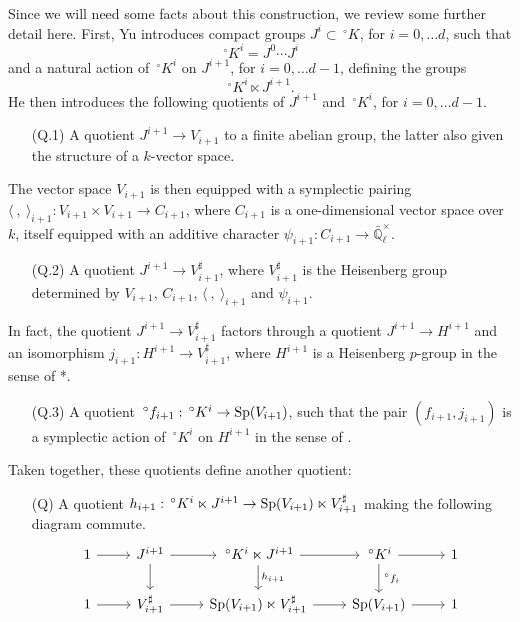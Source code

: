 \documentclass[10pt]{amsart}
\theoremstyle{plain}
\theoremstyle{definition}
\newcommand{\EE}{\mathbb{\bar Q}_\ell}
\newcommand{\Fq}{k}
\newcommand{\EEx}{\EE^\times}
\begin{document}
Since we will need some facts about this construction, we review some further detail here.
First, Yu introduces compact groups $J^i\subset \,^\circ K$, for $i=0, \ldots d$, such that 
\[
\,^\circ K^i = J^0\cdots J^{i}
\]
and a natural action of $\,^\circ K^i$ on $J^{i+1}$, for $i=0, \ldots d-1$, defining the groups
\[
\,^\circ K^i \ltimes J^{i+1}.
\]
He then introduces the following quotients of $J^{i+1}$ and $\,^\circ K^i$, for $i=0, \ldots d-1$.
\begin{enumerate}
\item[(Q.1)] A quotient $J^{i+1} \to V_{i+1}$ to a finite abelian group, the latter also given the structure of a $\Fq$-vector space.
\end{enumerate}
The vector space $V_{i+1}$ is then equipped with a symplectic pairing $\langle\ ,\ \rangle_{i+1} : V_{i+1}\times V_{i+1} \to C_{i+1}$, where $C_{i+1}$ is a one-dimensional vector space over $\Fq$, itself equipped with an additive character $\psi_{i+1} : C_{i+1} \to \EEx$.
\begin{enumerate}
\item[(Q.2)] A quotient $J^{i+1} \to V_{i+1}^\sharp$, where $V_{i+1}^\sharp$ is the Heisenberg group determined by $V_{i+1}$, $C_{i+1}$, $\langle\ ,\ \rangle_{i+1}$ and $\psi_{i+1}$.
\end{enumerate}
In fact, the quotient $J^{i+1} \to V_{i+1}^\sharp$ factors through a quotient $J^{i+1} \to H^{i+1}$ and an isomorphism $j_{i+1} : H^{i+1} \to V_{i+1}^\sharp$, where $H^{i+1}$ is a Heisenberg $p$-group in the sense of \cite{yu:construction}*{}.
\begin{enumerate}
\item[(Q.3)] A quotient $\,^\circ f_{i+1} : \,^\circ K^i \to {\operatorname{Sp}}(V_{i+1})$, such that the pair $(f_{i+1}, j_{i+1})$ is a symplectic action of $\,^\circ K^i$ on $H^{i+1}$ in the sense of \cite{yu:construction}.
\end{enumerate}
Taken together, these quotients define another quotient:
\begin{enumerate}
\item[(Q)] A quotient $h_{i+1} : \,^\circ K^i \ltimes J^{i+1} \to  {\operatorname{Sp}}(V_{i+1})\ltimes V_{i+1}^\sharp$ making the following diagram commute.
\[
\begin{tikzcd}
1 \arrow{r} & J^{i+1} \arrow{d} \arrow{r} & \,^\circ K^i \ltimes J^{i+1} \arrow{d}{h_{i+1}} \arrow{r} & \,^\circ K^i \arrow{r} \arrow{d}{\,^\circ f_i} & 1\\ 
1 \arrow{r} & V_{i+1}^\sharp \arrow{r} & \Sp(V_{i+1}) \ltimes V_{i+1}^\sharp \arrow{r} & \Sp(V_{i+1}) \arrow{r} & 1
\end{tikzcd}
\]
\end{enumerate}
\end{document}
